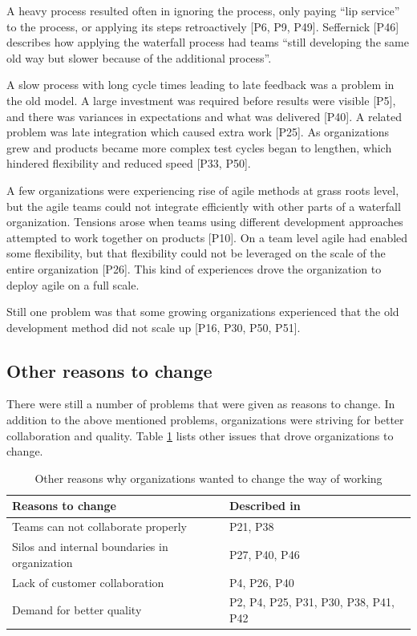 A heavy process resulted often in ignoring the process, only paying ``lip
service'' to the process, or applying its steps retroactively [P6, P9, P49].
Seffernick [P46] describes how applying the waterfall process had teams ``still
developing the same old way but slower because of the additional process''.

A slow process with long cycle times leading to late feedback was a problem in
the old model. A large investment was required before results were visible [P5],
and there was variances in expectations and what was delivered [P40]. A related
problem was late integration which caused extra work [P25]. As organizations
grew and products became more complex test cycles began to lengthen, which
hindered flexibility and reduced speed [P33, P50].

A few organizations were experiencing rise of agile methods at grass roots
level, but the agile teams could not integrate efficiently with other parts of
a waterfall organization. Tensions arose when teams using different development
approaches attempted to work together on products [P10]. On a team level agile
had enabled some flexibility, but that flexibility could not be leveraged on the
scale of the entire organization [P26].
This kind of experiences drove the organization to deploy agile on a full scale.

Still one problem was that some growing organizations experienced that the old
development method did not scale up [P16, P30, P50, P51].


\subsection{Other reasons to change}

There were still a number of problems that were given as reasons to change.
In addition to the above mentioned problems, organizations were striving for
better collaboration and quality. Table \ref{table:reasonstochange_other} lists
other issues that drove organizations to change.

\begin{table}[b]
    \centering
    \begin{tabular}{ >{\raggedright\arraybackslash}p{}
                     >{\raggedright\arraybackslash}p{} }
        \toprule
        Reasons to change           &  Described in  \\
        \midrule
        Teams can not collaborate properly   &  P21, P38  \\
        Silos and internal boundaries in organization   &  P27, P40, P46  \\
        Lack of customer collaboration       &  P4, P26, P40  \\
        Demand for better quality            &  P2, P4, P25, P31, P30, P38, P41, P42  \\
        \bottomrule
    \end{tabular}
    \caption{Other reasons why organizations wanted to change the way of working}
    \label{table:reasonstochange_other}
\end{table}

